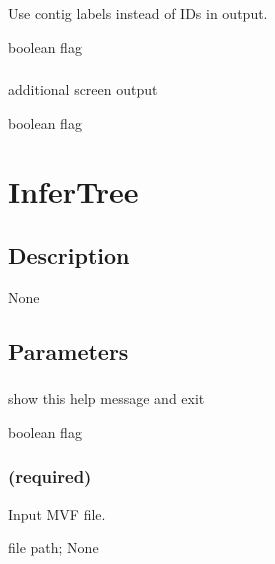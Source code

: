 \documentclass[letterpaper,11pt,english]{sphinxmanual}
\begin{document}
\subsubsection{}
\label{\detokenize{prog_desc:use-labels-uselabels}}
 Use contig labels instead of IDs in output.

 boolean flag


\subsubsection{}
\label{\detokenize{prog_desc:id108}}
 additional screen output

 boolean flag


\section{InferTree}
\label{\detokenize{prog_desc:infertree}}

\subsection{Description}
\label{\detokenize{prog_desc:id109}}
None


\subsection{Parameters}
\label{\detokenize{prog_desc:id110}}

\subsubsection{}
\label{\detokenize{prog_desc:id111}}
 show this help message and exit

 boolean flag


\subsubsection{ (required)}
\label{\detokenize{prog_desc:id112}}
 Input MVF file.

 file path;  None
\end{document}
